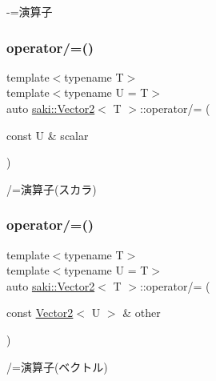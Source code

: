 -\/=演算子 

\mbox{\label{classsaki_1_1_vector2_a77f6c9bcfeb9f830edf2883069894a30}} 
\subsubsection{\texorpdfstring{operator/=()}{operator/=()}\hspace{0.1cm}{\footnotesize\ttfamily [1/2]}}
{\footnotesize\ttfamily template$<$typename T$>$ \\
template$<$typename U  = T$>$ \\
auto \mbox{\hyperlink{classsaki_1_1_vector2}{saki\+::\+Vector2}}$<$ T $>$\+::operator/= (\begin{DoxyParamCaption}\item[{const U \&}]{scalar }\end{DoxyParamCaption})\hspace{0.3cm}{\ttfamily [inline]}}



/=演算子(スカラ) 

\mbox{\label{classsaki_1_1_vector2_a8d4c4c7a19f84fc4eac995bdf9f93a13}} 
\subsubsection{\texorpdfstring{operator/=()}{operator/=()}\hspace{0.1cm}{\footnotesize\ttfamily [2/2]}}
{\footnotesize\ttfamily template$<$typename T$>$ \\
template$<$typename U  = T$>$ \\
auto \mbox{\hyperlink{classsaki_1_1_vector2}{saki\+::\+Vector2}}$<$ T $>$\+::operator/= (\begin{DoxyParamCaption}\item[{const \mbox{\hyperlink{classsaki_1_1_vector2}{Vector2}}$<$ U $>$ \&}]{other }\end{DoxyParamCaption})\hspace{0.3cm}{\ttfamily [inline]}}



/=演算子(ベクトル) 

